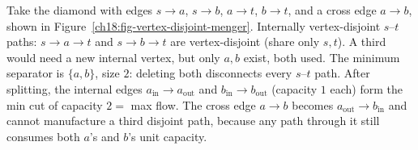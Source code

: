 \begin{labbox}
Take the diamond with edges $s\to a$, $s\to b$, $a\to t$, $b\to t$, and a cross edge $a\to b$, shown in Figure~\ref{ch18:fig-vertex-disjoint-menger}. Internally vertex-disjoint $s$--$t$ paths: $s\to a\to t$ and $s\to b\to t$ are vertex-disjoint (share only $s,t$). A third would need a new internal vertex, but only $a,b$ exist, both used. The minimum separator is $\{a,b\}$, size $2$: deleting both disconnects every $s$--$t$ path. After splitting, the internal edges $a_{\text{in}}\to a_{\text{out}}$ and $b_{\text{in}}\to b_{\text{out}}$ (capacity $1$ each) form the min cut of capacity $2 = $ max flow. The cross edge $a\to b$ becomes $a_{\text{out}}\to b_{\text{in}}$ and cannot manufacture a third disjoint path, because any path through it still consumes both $a$'s and $b$'s unit capacity.
\end{labbox}


